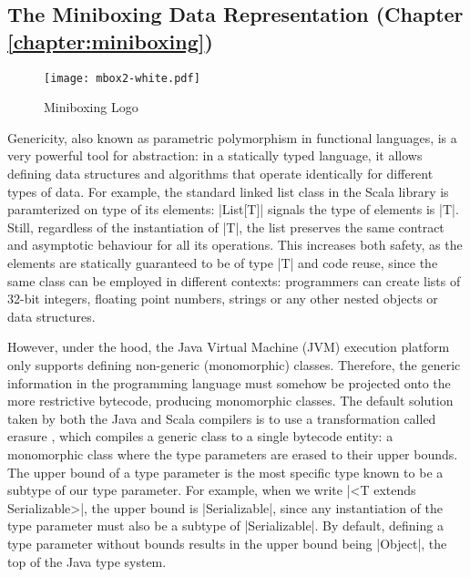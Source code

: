 \subsection{The Miniboxing Data Representation (Chapter \ref{chapter:miniboxing})}

\begin{wrapfigure}{r}{50mm}
  \centering
  \vspace{-3em}
  \texttt{[image: mbox2-white.pdf]}
  \vspace{-3em}
  \caption{Miniboxing Logo}
\end{wrapfigure}

Genericity, also known as parametric polymorphism in functional languages, is a very powerful tool for abstraction: in a statically typed language, it allows defining data structures and algorithms that operate identically for different types of data. For example, the standard linked list class in the Scala library is paramterized on type of its elements: |List[T]| signals the type of elements is |T|. Still, regardless of the instantiation of |T|, the list preserves the same contract and asymptotic behaviour for all its operations. This increases both safety, as the elements are statically guaranteed to be of type |T| and code reuse, since the same class can be employed in different contexts: programmers can create lists of 32-bit integers, floating point numbers, strings or any other nested objects or data structures.

However, under the hood, the Java Virtual Machine (JVM) execution platform only supports defining non-generic (monomorphic) classes. Therefore, the generic information in the programming language must somehow be projected onto the more restrictive bytecode, producing monomorphic classes. The default solution taken by both the Java and Scala compilers is to use a transformation called erasure \cite{java-erasure}, which compiles a generic class to a single bytecode entity: a monomorphic class where the type parameters are erased to their upper bounds. The upper bound of a type parameter is the most specific type known to be a subtype of our type parameter. For example, when we write |<T extends Serializable>|, the upper bound is |Serializable|, since any instantiation of the type parameter must also be a subtype of |Serializable|. By default, defining a type parameter without bounds results in the upper bound being |Object|, the top of the Java type system.

